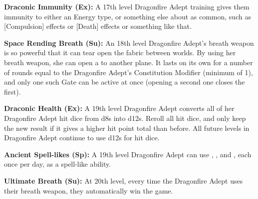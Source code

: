 \textbf{Draconic Immunity (Ex):} A 17th level Dragonfire Adept training gives them immunity to either an Energy type, or something else about as common, such as [Compulsion] effects or [Death] effects or something like that.

\textbf{Space Rending Breath (Su):} An 18th level Dragonfire Adept's breath weapon is so powerful that it can tear open the fabric between worlds. By using her breath weapon, she can open a  to another plane. It lasts on its own for a number of rounds equal to the Dragonfire Adept's Constitution Modifier (minimum of 1), and only one such Gate can be active at once (opening a second one closes the first).

\textbf{Draconic Health (Ex):} A 19th level Dragonfire Adept converts all of her Dragonfire Adept hit dice from d8s into d12s. Reroll all hit dice, and only keep the new result if it gives a higher hit point total than before. All future levels in Dragonfire Adept continue to use d12s for hit dice.

\textbf{Ancient Spell-likes (Sp):} A 19th level Dragonfire Adept can use , , and , each once per day, as a spell-like ability.

\textbf{Ultimate Breath (Su):} At 20th level, every time the Dragonfire Adept uses their breath weapon, they automatically win the game.

